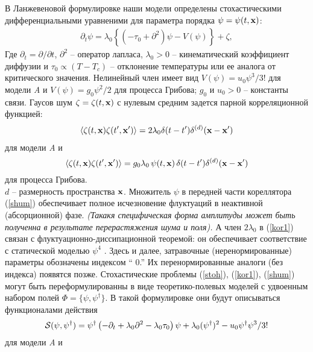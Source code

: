 \documentclass[a4paper,10pt]{article}
\def\S{{\cal S}}
\def\S{{\cal S}}
\begin{document}
В Ланжевеновой формулировке наши модели определены стохастическими
 дифференциальными уравненими для параметра порядка 
$\psi = \psi(t,{\bf x})$:
\begin{eqnarray}
\partial_{t} \psi = \lambda_{0} \left\{ (-\tau_{0} +
\partial^{2}) \psi - V(\psi) \right\} + \zeta ,
\label{stoh}
\end{eqnarray}
Где  $\partial_{t}= \partial/ \partial t$, $\partial^{2}$  -- оператор лапласа,
$\lambda_{0}>0$ -- кинематический коэффициент диффузии и
$\tau_{0} \propto (T-T_{c})$ -- отклонение температуры или ее аналога от критического значения.
Нелинейный член имеет вид $V(\psi)=u_{0} \psi^{3}/3!$ для модели {\it A}
и $V(\psi)=g_{0} \psi^{2}/2$ для процесса Грибова;
 $g_{0}$ и $u_{0}>0$ -- константы связи. Гаусов шум 
$\zeta=\zeta(t,{\bf x})$ с нулевым средним задется парной корреляционной функцией:
\begin{eqnarray}
\langle \zeta (t,{\bf x})\zeta (t',{\bf x'}) \rangle =
2 \lambda_{0}  \delta(t-t')\delta^{(d)}({\bf x}-{\bf x}')
\label{kor1}
\end{eqnarray}
для модели {\it A} и
\begin{equation}
\langle \zeta (t,{\bf x})\zeta (t',{\bf x'}) \rangle = g_{0}\lambda_{0}\,
\psi(t,{\bf x})\,   \delta(t-t')\delta^{(d)}({\bf x}-{\bf x}')
\label{shum}
\end{equation}
для процесса Грибова.\\
$d$ -- размерность пространства ${\bf x}$. Множитель $\psi$ в передней части кореллятора (\ref{shum}) обеспечивает полное исчезновение флуктуаций в неактивной (абсорционной) фазе.
 {\it {(Такакя специфическая форма амплитуды может быть полученна в результате перерастяжения шума и поля). }}
А член $2\lambda_{0}$ в (\ref{kor1}) связан с флуктуационно-диссипационной теоремой: он обеспечивает соответствие с статической моделью $\psi^{4}$ .
Здесь и далее, затравочные (неренормированные) параметры обозначены индексом `` 0.'' Их перенормированные аналоги (без индекса) появятся позже.
Стохастические проблемы (\ref{stoh}), (\ref{kor1}), (\ref{shum}) могут быть переформулированны в виде теоретико-полевых моделей с удвоенным набором полей
 $\Phi = \{\psi,\psi^{\dag}\}$. В такой формулировке они будут описываться функционалами действия
\begin{eqnarray}
\S(\psi,\psi^{\dag}) =  \psi^{\dag}
\left(-\partial_{t}+\lambda_{0} \partial^{2}- \lambda_{0}\tau_{0}\right)
\psi + \lambda_{0} (\psi^{\dagger})^2 - u_{0} \psi^{\dag}\psi^3/3!
\label{actionA}
\end{eqnarray}
для модели {\it A} и
\end{document}
